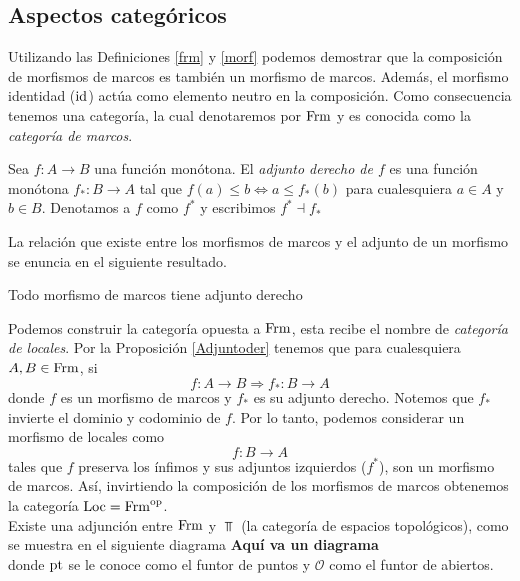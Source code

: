 \documentclass{comunicaciones}
\begin{document}
\subsection{Aspectos categóricos}
        Utilizando las Definiciones \ref{frm} y \ref{morf} podemos demostrar que la composición de morfismos de marcos es también un morfismo de marcos. Además, el morfismo identidad ($\mathrm{id}$) actúa como elemento neutro en la composición. Como consecuencia tenemos una categoría, la cual denotaremos por $\mathrm{Frm}$ y es conocida como la \emph{categoría de marcos}.
        
        \begin{dfn}\label{adjder}
        Sea $f:A\to B$ una función monótona. El \emph{adjunto derecho de $f$} es una función monótona $f_*:B\to A$ tal que $f(a)\leq b\Leftrightarrow a\leq f_*(b)$ para cualesquiera $a\in A$ y $b\in B$. Denotamos a $f$ como $f^*$ y escribimos \emph{$f^*\dashv f_*$}
        \end{dfn}
        
        La relación que existe entre los morfismos de marcos y el adjunto de un morfismo se enuncia en el siguiente resultado.
        
        \begin{prop}\label{Adjuntoder}
        Todo morfismo de marcos tiene adjunto derecho
        \end{prop}
        
        Podemos construir la categoría opuesta a $\mathrm{Frm}$, esta recibe el nombre de \emph{categoría de locales}. Por la Proposición \ref{Adjuntoder} tenemos que para cualesquiera $A, B\in \mathrm{Frm}$, si
        \[
        f\colon A\rightarrow B \Longrightarrow f_*\colon B\rightarrow A
        \]
        donde $f$ es un morfismo de marcos y $f_*$ es su adjunto derecho. Notemos que $f_*$ invierte el dominio y codominio de $f$. Por lo tanto, podemos considerar un morfismo de locales como 
        \[
        f\colon B\rightarrow A 
        \]
        tales que $f$ preserva los ínfimos y sus adjuntos izquierdos ($f^*$), son un morfismo de marcos. Así, invirtiendo la composición de los morfismos de marcos obtenemos la categoría $\mathrm{Loc}=\mathrm{Frm}^{\mathrm{op}}$.\\
        
        Existe una adjunción entre $\mathrm{Frm}$ y $\Top$ (la categoría de espacios topológicos), como se muestra en el siguiente diagrama
        \textbf{Aquí va un diagrama}\\

        donde $\mathrm{pt}$ se le conoce como el funtor de puntos y $\mathcal{O}$ como el funtor de abiertos.\\
        
\end{document}
